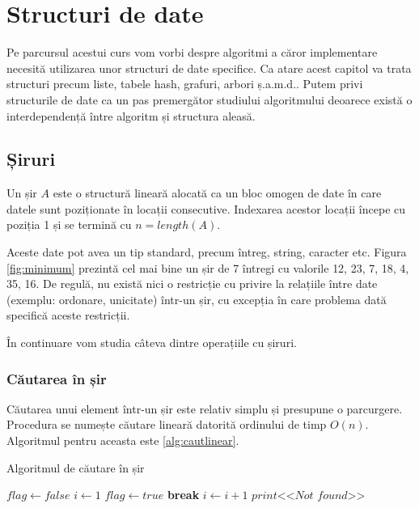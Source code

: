 \chapter{Structuri de date}
\label{abody}%

Pe parcursul acestui curs vom vorbi despre algoritmi a căror implementare necesită utilizarea unor structuri de date specifice.
Ca atare acest capitol va trata structuri precum liste, tabele hash, grafuri, arbori ș.a.m.d.. Putem privi structurile de date ca un pas premergător studiului algoritmului deoarece există o interdependență între algoritm și structura aleasă.

\section{Șiruri}

Un șir $A$ este o structură lineară alocată ca un bloc omogen de date în care datele sunt poziționate în locații consecutive. Indexarea acestor locații începe cu poziția 1 și se termină cu $n=length(A)$. 

Aceste date pot avea un tip standard, precum întreg, string, caracter etc. Figura \ref{fig:minimum} prezintă cel mai bine un șir de 7 întregi cu valorile {12, 23, 7, 18, 4, 35, 16}. De regulă, nu există nici o restricție cu privire la relațiile între date (exemplu: ordonare, unicitate) într-un șir, cu excepția în care problema dată specifică aceste restricții.

În continuare vom studia câteva dintre operațiile cu șiruri.

\subsection{Căutarea în șir}

Căutarea unui element într-un șir este relativ simplu și presupune o parcurgere. Procedura se numește căutare lineară datorită ordinului de timp $O(n)$. Algoritmul pentru aceasta este \ref{alg:cautlinear}.

\begin{algorithm}[H]
	\caption{Algoritmul de căutare în șir}\label{alg:cautlinear}
	\begin{algorithmic}[1]
		\State $flag \gets false$
		\State $i \gets 1$
		\State $flag \gets true$
		\State \textbf{break}
		\EndIf 
		\State $i \gets i+1$
		\EndWhile 
		\State $print \textit{<<Not found>>}$
		\EndIf 
		\EndProcedure
	\end{algorithmic}
\end{algorithm}


